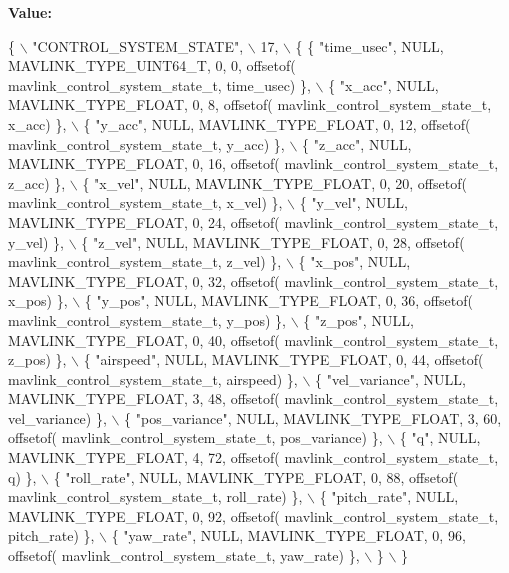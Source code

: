 {\bfseries Value\+:}
\begin{DoxyCode}
\{ \(\backslash\)
    \textcolor{stringliteral}{"CONTROL\_SYSTEM\_STATE"}, \(\backslash\)
    17, \(\backslash\)
    \{  \{ \textcolor{stringliteral}{"time\_usec"}, NULL, MAVLINK_TYPE_UINT64_T, 0, 0, offsetof(
      mavlink_control_system_state_t, time\_usec) \}, \(\backslash\)
         \{ \textcolor{stringliteral}{"x\_acc"}, NULL, MAVLINK_TYPE_FLOAT, 0, 8, offsetof(
      mavlink_control_system_state_t, x\_acc) \}, \(\backslash\)
         \{ \textcolor{stringliteral}{"y\_acc"}, NULL, MAVLINK_TYPE_FLOAT, 0, 12, offsetof(
      mavlink_control_system_state_t, y\_acc) \}, \(\backslash\)
         \{ \textcolor{stringliteral}{"z\_acc"}, NULL, MAVLINK_TYPE_FLOAT, 0, 16, offsetof(
      mavlink_control_system_state_t, z\_acc) \}, \(\backslash\)
         \{ \textcolor{stringliteral}{"x\_vel"}, NULL, MAVLINK_TYPE_FLOAT, 0, 20, offsetof(
      mavlink_control_system_state_t, x\_vel) \}, \(\backslash\)
         \{ \textcolor{stringliteral}{"y\_vel"}, NULL, MAVLINK_TYPE_FLOAT, 0, 24, offsetof(
      mavlink_control_system_state_t, y\_vel) \}, \(\backslash\)
         \{ \textcolor{stringliteral}{"z\_vel"}, NULL, MAVLINK_TYPE_FLOAT, 0, 28, offsetof(
      mavlink_control_system_state_t, z\_vel) \}, \(\backslash\)
         \{ \textcolor{stringliteral}{"x\_pos"}, NULL, MAVLINK_TYPE_FLOAT, 0, 32, offsetof(
      mavlink_control_system_state_t, x\_pos) \}, \(\backslash\)
         \{ \textcolor{stringliteral}{"y\_pos"}, NULL, MAVLINK_TYPE_FLOAT, 0, 36, offsetof(
      mavlink_control_system_state_t, y\_pos) \}, \(\backslash\)
         \{ \textcolor{stringliteral}{"z\_pos"}, NULL, MAVLINK_TYPE_FLOAT, 0, 40, offsetof(
      mavlink_control_system_state_t, z\_pos) \}, \(\backslash\)
         \{ \textcolor{stringliteral}{"airspeed"}, NULL, MAVLINK_TYPE_FLOAT, 0, 44, offsetof(
      mavlink_control_system_state_t, airspeed) \}, \(\backslash\)
         \{ \textcolor{stringliteral}{"vel\_variance"}, NULL, MAVLINK_TYPE_FLOAT, 3, 48, offsetof(
      mavlink_control_system_state_t, vel\_variance) \}, \(\backslash\)
         \{ \textcolor{stringliteral}{"pos\_variance"}, NULL, MAVLINK_TYPE_FLOAT, 3, 60, offsetof(
      mavlink_control_system_state_t, pos\_variance) \}, \(\backslash\)
         \{ \textcolor{stringliteral}{"q"}, NULL, MAVLINK_TYPE_FLOAT, 4, 72, offsetof(
      mavlink_control_system_state_t, q) \}, \(\backslash\)
         \{ \textcolor{stringliteral}{"roll\_rate"}, NULL, MAVLINK_TYPE_FLOAT, 0, 88, offsetof(
      mavlink_control_system_state_t, roll\_rate) \}, \(\backslash\)
         \{ \textcolor{stringliteral}{"pitch\_rate"}, NULL, MAVLINK_TYPE_FLOAT, 0, 92, offsetof(
      mavlink_control_system_state_t, pitch\_rate) \}, \(\backslash\)
         \{ \textcolor{stringliteral}{"yaw\_rate"}, NULL, MAVLINK_TYPE_FLOAT, 0, 96, offsetof(
      mavlink_control_system_state_t, yaw\_rate) \}, \(\backslash\)
         \} \(\backslash\)
\}
\end{DoxyCode}
